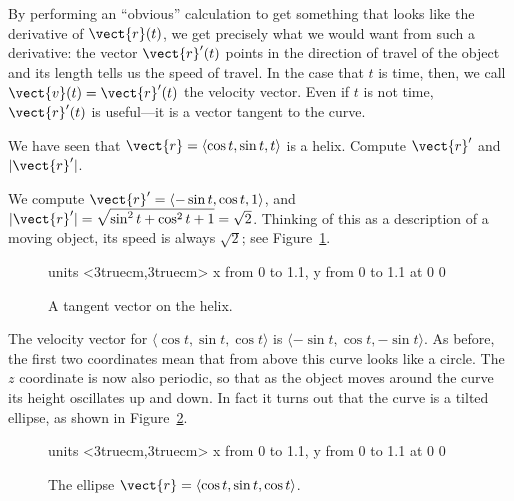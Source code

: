 By performing an ``obvious'' calculation to get something that
looks like the derivative of $\vect{r}(t)$, we get precisely what we
would want from such a derivative: the vector $\vect{r}'(t)$
points in the direction of travel of the object and its length tells
us the speed of travel. In the case that $t$ is time, then, we call 
$\vect{v}(t)=\vect{r}'(t)$ the velocity vector. Even if $t$ is not time,
$\vect{r}'(t)$ is useful---it is a vector tangent to the curve.

\begin{example}{}{}
We have seen that $\vect{r}=\langle \cos t,\sin t,t\rangle$ is a helix. Compute $\vect{r}'$ and $|\vect{r}'|$.
\end{example}

\begin{solution}
We compute $\vect{r}'=\langle -\sin t,\cos t,1\rangle$, and
$|\vect{r}'|=\sqrt{\sin^2 t+\cos^2 t+1}=\sqrt2$. Thinking of this as
a description of a moving object, its speed is always $\sqrt2$; see
Figure~\ref{fig:helix with tangent}.
\end{solution}

\begin{figure}[H]
\centerline{
\vbox{\beginpicture
\normalgraphs
\setcoordinatesystem units <3truecm,3truecm>
\setplotarea x from 0 to 1.1, y from 0 to 1.1
 at 0 0
\endpicture}}
\caption{A tangent vector on the helix. \label{fig:helix with tangent}}
\end{figure}

\begin{example}{}{}
The velocity vector for $\langle \cos t,\sin
t,\cos t\rangle$ is $\langle -\sin t,\cos
t,-\sin t\rangle$. As before, the first two coordinates mean that from
above this curve looks like a circle. The $z$ coordinate is now also
periodic, so that as the object moves around the curve its height
oscillates up and down. In fact it turns out that the curve is a
tilted ellipse, as shown in Figure~\ref{fig:tilted ellipse}.
\end{example}

\begin{figure}[H]
\centerline{
\vbox{\beginpicture
\normalgraphs
\setcoordinatesystem units <3truecm,3truecm>
\setplotarea x from 0 to 1.1, y from 0 to 1.1
 at 0 0
\endpicture}}
\caption{The ellipse $\vect{r}=\langle \cos t,\sin
t,\cos t\rangle$. \label{fig:tilted ellipse}}
\end{figure}

